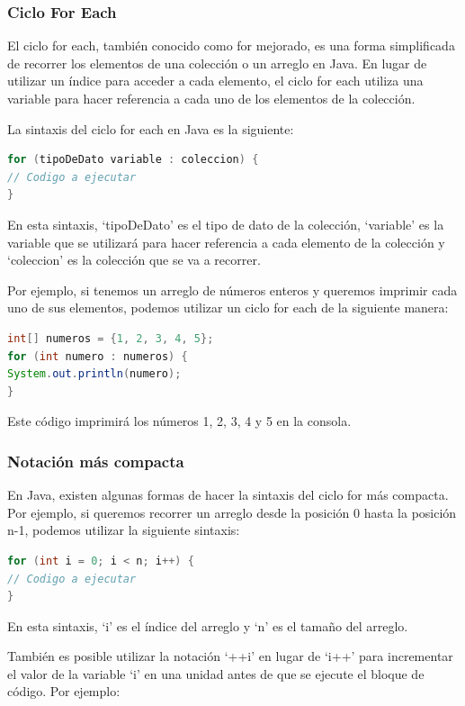 \documentclass[executivepaper]{article}
\begin{document}
\subsubsection*{Ciclo For Each}

El ciclo for each, también conocido como for mejorado, es una forma simplificada de recorrer los elementos de una colección o un arreglo en Java. En lugar de utilizar un índice para acceder a cada elemento, el ciclo for each utiliza una variable para hacer referencia a cada uno de los elementos de la colección.

La sintaxis del ciclo for each en Java es la siguiente:

\begin{lstlisting}[language=Java]
for (tipoDeDato variable : coleccion) {
// Codigo a ejecutar
}
\end{lstlisting}
En esta sintaxis, \enquote*{tipoDeDato} es el tipo de dato de la colección, \enquote*{variable} es la variable que se utilizará para hacer referencia a cada elemento de la colección y \enquote*{coleccion} es la colección que se va a recorrer.

Por ejemplo, si tenemos un arreglo de números enteros y queremos imprimir cada uno de sus elementos, podemos utilizar un ciclo for each de la siguiente manera:

\begin{lstlisting}[language=Java]
int[] numeros = {1, 2, 3, 4, 5};
for (int numero : numeros) {
System.out.println(numero);
}
\end{lstlisting}
Este código imprimirá los números 1, 2, 3, 4 y 5 en la consola.

\subsubsection*{Notación más compacta}

En Java, existen algunas formas de hacer la sintaxis del ciclo for más compacta. Por ejemplo, si queremos recorrer un arreglo desde la posición 0 hasta la posición n-1, podemos utilizar la siguiente sintaxis:

\begin{lstlisting}[language=Java]
for (int i = 0; i < n; i++) {
// Codigo a ejecutar
}
\end{lstlisting}
En esta sintaxis, \enquote*{i} es el índice del arreglo y \enquote*{n} es el tamaño del arreglo.

También es posible utilizar la notación \enquote*{++i} en lugar de \enquote*{i++} para incrementar el valor de la variable \enquote*{i} en una unidad antes de que se ejecute el bloque de código. Por ejemplo:
\end{document}
